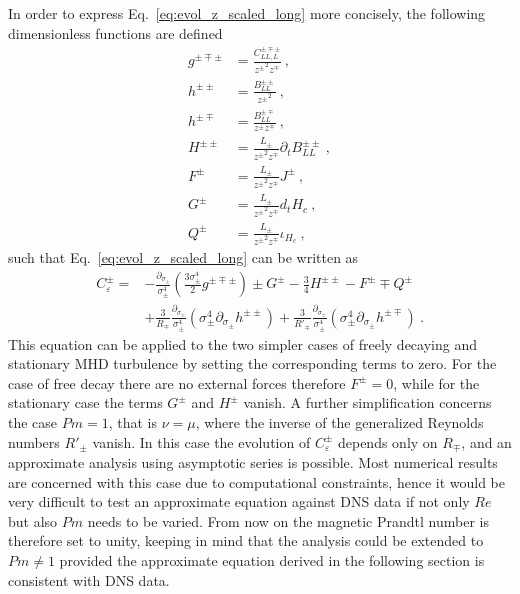 \documentclass[aps,pre,onecolumn,superscriptaddress,notitlepage]{revtex4-1}
\newcommand{\Ceps}{C_\varepsilon}
\begin{document}
In order to express Eq.~\eqref{eq:evol_z_scaled_long} more concisely, the following dimensionless functions are defined 
\begin{align}
g^{\pm\mp\pm} &= \frac{C^{\pm\mp\pm}_{LL,L}}{{z^\pm}^2z^\mp} \ , \\
h^{\pm\pm} &= \frac{B_{LL}^{\pm\pm}}{{z^\pm}^2} \ , \\
h^{\pm\mp} &= \frac{B_{LL}^{\pm\mp}}{{z^\pm}z^\mp} \ , \\
H^{\pm\pm}  &=\frac{L_\pm}{{z^\pm}^2z^\mp} \partial_t B_{LL}^{\pm\pm} \ , \\ 
F^\pm  &=\frac{L_\pm}{{z^\pm}^2z^\mp} J^\pm\ , \\
G^\pm & = \frac{L_\pm}{{z^\pm}^2z^\mp} d_t H_c \ , \\ 
Q^\pm & = \frac{L_\pm}{{z^\pm}^2z^\mp} \iota_{H_c} \ , 
\end{align}
such that Eq.~\eqref{eq:evol_z_scaled_long} can be written as
\begin{align}
\Ceps^\pm = 
& -\frac{\partial_{\sigma_\pm}}{\sigma_\pm^4} \left(\frac{3\sigma_\pm^4}{2}g^{\pm\mp\pm}\right) 
\pm G^\pm -\frac{3}{4}H^{\pm\pm} -F^\pm \mp Q^\pm \nonumber \\
& +\frac{3}{R_\mp} \frac{\partial_{\sigma_\pm}}{\sigma_\pm^4} \left(\sigma_\pm^4 \partial_{\sigma_\pm}h^{\pm\pm} \right)
+\frac{3}{R'_\mp} \frac{\partial_{\sigma_\pm}}{\sigma_\pm^4} \left(\sigma_\pm^4 \partial_{\sigma_\pm}h^{\pm\mp} \right) \ .
\label{eq:evol_z_scaled}
\end{align}
This equation can be applied to the two simpler cases of freely decaying and stationary MHD turbulence
by setting the corresponding terms to zero. For the case of free decay there are no external forces 
therefore $F^\pm = 0$, while for the stationary case the terms $G^\pm$ and $H^\pm$ vanish. 
A further simplification concerns the case $Pm =1$, that is $\nu=\mu$, where the inverse of the 
generalized Reynolds numbers $R'_\pm$ vanish. 
In this case the evolution of $\Ceps^\pm$ depends only on $R_\mp$, and an approximate analysis 
using asymptotic series is possible. Most numerical results are concerned 
with this case due to computational constraints, hence it would be very difficult to 
test an approximate equation against DNS data if not only $Re$ but also $Pm$ needs to be varied.
From now on the magnetic Prandtl number is therefore set to unity, keeping in mind that the analysis
could be extended to $Pm \neq 1$ provided the approximate equation derived in the following section
is consistent with DNS data.
\end{document}
